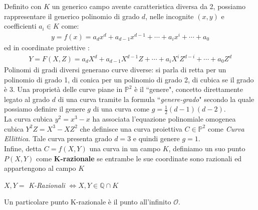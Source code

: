 \documentclass[a4paper,12pt]{tesiinfo}
\newcommand\ddfrac[2]{\frac{\displaystyle #1}{\displaystyle #2}}
\renewcommand{\footnotesize}{\fontsize{9pt}{11pt}\selectfont}
\begin{document}
%
%
%
%
%
%
%
%
Definito con $K$ un generico campo avente caratteristica diversa da 2, possiamo rappresentare il generico polinomio di grado $d$, nelle incognite $(x, y)$ e coefficienti $a_i \in K$ come:
\begin{align*}
 y = f(x) = a_dx^d + a_{d-1}x^{d-1} + \cdots + a_ix^i + \cdots + a_0
\end{align*}
ed in coordinate proiettive \cite{baseTheory_CurvePianeCubiche}:
\begin{align*}
 Y = F(X, Z) = a_dX^d + a_{d-1}X^{d-1}Z + \cdots + a_iX^iZ^{d-i} + \cdots + a_0Z^d
\end{align*}
Polinomi di gradi diversi generano curve diverse: si parla di retta per un polinomio di grado 1, di conica per un polinomio di grado 2, di cubica se il grado \`e 3. Una propriet\`a delle curve piane in $\mathbb{P}^2$ \`e il ``genere", concetto direttamente legato al grado $d$ di una curva tramite la formula ``\textit{genere-grado}" secondo la quale possiamo definire il genere $g$ di una curva come $g = \ddfrac{1}{2} (d-1)(d-2)$.
\\
La curva cubica $y^2 = x^3 -x$ ha associata l'equazione polinomiale omogenea cubica $Y^2Z = X^3 - XZ^2$ che definisce una curva proiettiva $C \in \mathbb{P}^2$ come \textit{Curva Ellittica}. Tale curva presenta grado $d = 3$ e quindi genere $g = 1$.\\
Infine, detta $C = f(X, Y)$ una curva in un campo $K$, definiamo un suo punto $P(X, Y)$ come \textbf{$\mathbold{K}$-razionale} se entrambe le sue coordinate sono razionali ed appartengono al campo $K$
\begin{center}
$X, Y = $ \textit{K-Razionali} $\iff X, Y \in \mathbb{Q} \cap  K$
\end{center}
Un particolare punto K-razionale \`e il punto all'infinito $\mathcal{O}$.
%
%
%
\end{document}
